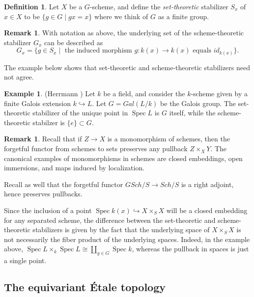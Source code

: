 \documentclass[draftthesis,tocnosub,noragright,centerchapter,10pt]{uiucthesis2009}
\DeclareMathOperator{\Spec}{Spec}
\theoremstyle{plain}
\theoremstyle{definition}
\newtheorem{example}[lemma]{Example}
\newtheorem{definition}[lemma]{Definition}
\newtheorem{remark}[lemma]{Remark}
\begin{document}
\begin{definition}
Let $X$ be a $G$-scheme, and define the \emph{set-theoretic}
stabilizer $S_x$ of $x \in X$ to be $\{g \in G
\mid gx = x\}$ where we think of $G$ as a finite group. 
\end{definition}

\begin{remark}
With notation as above, the underlying set of the scheme-theoretic
stabilizer $G_x$ can be described as
\[
G_x = \{g \in S_x \mid \text{ the induced morphism $g : k(x)
  \rightarrow k(x)$ equals } id_{k(x)}\}.
\]
\end{remark}



The example below shows that set-theoretic and scheme-theoretic
stabilizers need not agree.

\begin{example} (Herrmann \cite{GrpSchHerr})
Let $k$ be a field, and consider the $k$-scheme given by a finite
Galois extension $k \hookrightarrow L$. Let $G = Gal(L/k)$ be the
Galois group. The set-theoretic stabilizer of the unique point in
$\Spec L$ is $G$ itself, while the scheme-theoretic stabilzer is
$\{e\} \subset G$. 
\end{example}

\begin{remark}
Recall that if $Z \rightarrow X$ is a monomorphism of schemes, then
the forgetful functor from schemes to sets preserves any pullback $Z
\times_X Y$. The canonical examples of monomorphisms in schemes are
closed embeddings, open immersions, and maps induced by localization. 

Recall as well that the forgetful functor $GSch/S \rightarrow Sch/S$
is a right adjoint, hence preserves pullbacks.

Since the inclusion of a point $\Spec k(x) \hookrightarrow X \times_S X$
will be a closed embedding for any separated scheme, the difference
between the set-theoretic and scheme-theoretic stabilizers is given by
the fact that the underlying space of $X \times_S X$ is not
necessarily the fiber product of the underlying spaces. Indeed, in the
example above, $\Spec L \times_k \Spec L \cong \coprod_{g \in G} \Spec
k$, whereas the pullback in spaces is just a single point. 
\end{remark}

\subsection{The equivariant \'Etale topology}
\end{document}
